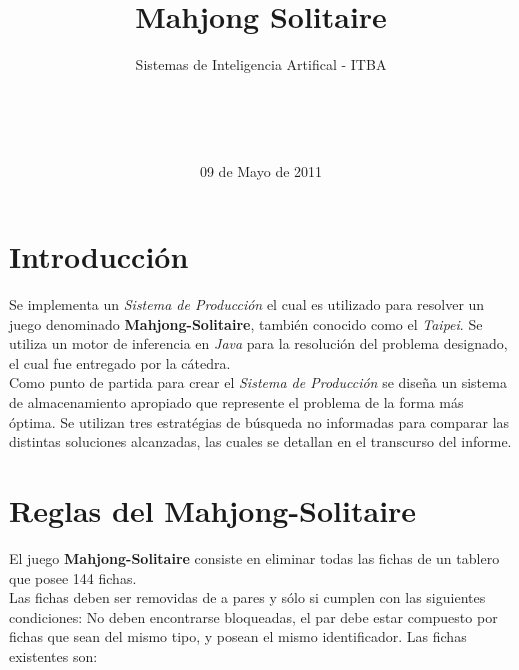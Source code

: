 \documentclass{sig-alternate}
\begin{document}

\title{Mahjong Solitaire}
\subtitle{Sistemas de Inteligencia Artifical - ITBA}


\author{
	\\
	\\
	\\
}

\date{09 de Mayo de 2011}

\maketitle

\section*{Introducci\'on}
	Se implementa un \textit{Sistema de Producci\'on} el cual es utilizado para resolver un juego denominado \textbf{Mahjong-Solitaire}, tambi\'en conocido como el \textit{Taipei}. Se utiliza un motor de inferencia en \textit{Java} para la resoluci\'on del problema designado, el cual fue entregado por la c\'atedra. \\
	Como punto de partida para crear el \textit{Sistema de Producci\'on} se dise\~{n}a un sistema de almacenamiento apropiado que represente el problema de la forma m\'as \'optima. Se utilizan tres estrat\'egias de b\'usqueda no informadas para comparar las distintas soluciones alcanzadas, las cuales se detallan en el transcurso del informe.

\section*{Reglas del Mahjong-Solitaire}
	El juego \textbf{Mahjong-Solitaire} consiste en eliminar todas las fichas de un tablero que posee 144 fichas. \\
	Las fichas deben ser removidas de a pares y s\'olo si cumplen con las siguientes condiciones: No deben encontrarse bloqueadas, el par debe estar compuesto por fichas que sean del mismo tipo, y posean el mismo identificador. Las fichas existentes son:
\end{document}

